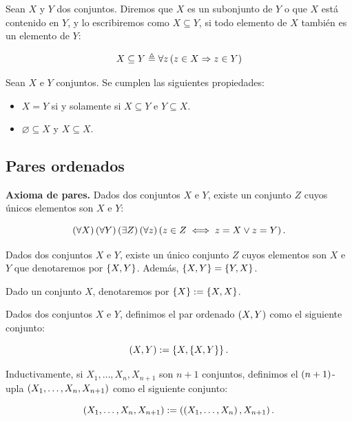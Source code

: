 \begin{definition}
\rm Sean $X$ y $Y$ dos conjuntos. Diremos que $X$ es un subonjunto de $Y$ o que $X$ está contenido en $Y$, y lo escribiremos como $X\subseteq Y$, si todo elemento de $X$ también es un elemento de $Y$:

\begin{equation}
  X\subseteq Y\triangleq \forall z\left(z\in X\Rightarrow z\in Y\right)
\end{equation}
\end{definition}

\begin{proposition}
\rm Sean $X$ e $Y$ conjuntos. Se cumplen las siguientes propiedades:
\begin{itemize}
  \item[1.] $X=Y$ si y solamente si $X\subseteq Y$ e $Y\subseteq X$.
  \item[2.] $\varnothing\subseteq X$ y $X\subseteq X$. 
\end{itemize}
\end{proposition}

\subsection{Pares ordenados}

\textbf{Axioma de pares.} Dados dos conjuntos $X$ e $Y$, existe un conjunto $Z$ cuyos únicos elementos son $X$ e $Y$:

\begin{equation}
  \left(\forall X\right)\left(\forall Y\right)\left(\exists Z\right)\left(\forall z\right)\left(z\in Z\iff z=X\lor z=Y\right).
\end{equation}

\begin{proposition}
  \rm Dados dos conjuntos $X$ e $Y$, existe un único conjunto $Z$ cuyos elementos son $X$ e $Y$ que denotaremos por $\left\{X,Y\right\}$. Además, $\left\{X,Y\right\}=\left\{Y,X\right\}$.
\end{proposition}


Dado un conjunto $X$, denotaremos por $\left\{X\right\}:=\left\{X,X\right\}$.

\begin{definition}
  \rm Dados dos conjuntos $X$ e $Y$, definimos el par ordenado $\left(X,Y\right)$ como el siguiente conjunto:

  \begin{equation}
    \left(X,Y\right):=\left\{X,\left\{X,Y\right\}\right\}.
  \end{equation}

  Inductivamente, si $X_1,\dots,X_n, X_{n+1}$ son $n+1$ conjuntos, definimos el $\left(n+1\right)$-upla $\left(X_1,\dots,X_n,X_{n+1}\right)$ como el siguiente conjunto:

  \begin{equation}
    \left(X_1,\dots,X_n,X_{n+1}\right):=\left(\left(X_1,\dots,X_n\right),X_{n+1}\right).
  \end{equation}
\end{definition}


